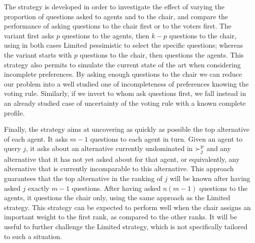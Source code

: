 \documentclass[sigconf, anonymous]{aamas}
\begin{document}
The  strategy is developed in order to investigate the effect of varying the proportion of questions asked to agents and to the chair, and compare the performance of asking questions to the chair first or to the voters first. 
The  variant first asks $p$ questions to the agents, then $k-p$ questions to the chair, using in both cases Limited pessimistic to select the specific questions; whereas the  variant starts with $p$ questions to the chair, then questions the agents. 
This strategy also permits to simulate the current state of the art when considering incomplete preferences. By asking enough questions to the chair we can reduce our problem into a well studied one of incompleteness of preferences knowing the voting rule. Similarly, if we invert to whom ask questions first, we fall instead in an already studied case of uncertainty of the voting rule with a known complete profile. 

Finally, the  strategy aims at uncovering as quickly as possible the top alternative of each agent. It asks $m-1$ questions to each agent in turn. 
Given an agent to query $j$, it asks about an alternative currently undominated in $\succ^\text{p}_j$ and any alternative that it has not yet asked about for that agent, or equivalently, any alternative that is currently incomparable to this alternative. This approach guarantees that the top alternative in the ranking of $j$ will be known after having asked $j$ exactly $m-1$ questions.
After having asked $n (m-1)$ questions to the agents, it questions the chair only, using the same approach as the Limited strategy.
This strategy can be expected to perform well when the chair assigns an important weight to the first rank, as compared to the other ranks. It will be useful to further challenge the Limited strategy, which is not specifically tailored to such a situation.

\end{document}

